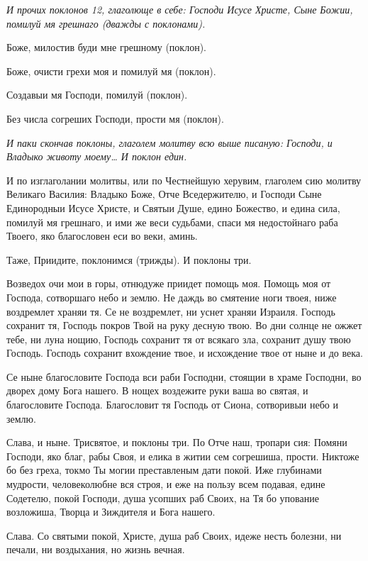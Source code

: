\itshape И прочих поклонов 12, глаголюще в себе:\normalfont{} Господи Исусе Христе, Сыне Божии, помилуй мя грешнаго (дважды с поклонами).

Боже, милостив буди мне грешному (поклон).

Боже, очисти грехи моя и помилуй мя (поклон).

Создавыи мя Господи, помилуй (поклон).

Без числа согреших Господи, прости мя (поклон).

\itshape И паки скончав поклоны, глаголем молитву всю выше писаную:\normalfont{} Господи, и Владыко животу моему… И поклон един. 


И по изглаголании молитвы, или по Честнейшую херувим, глаголем сию молитву Великаго Василия: Владыко Боже, Отче Вседержителю, и Господи Сыне Единородныи Исусе Христе, и Святыи Душе, едино Божество, и едина сила, помилуй мя грешнаго, и ими же веси судьбами, спаси мя недостойнаго раба Твоего, яко благословен еси во веки, аминь. 


Таже, Приидите, поклонимся (трижды). И поклоны три. 




Возведох очи мои в горы, отнюдуже приидет помощь моя. Помощь моя от Господа, сотворшаго небо и землю. Не даждь во смятение ноги твоея, ниже воздремлет храняи тя. Се не воздремлет, ни уснет храняи Израиля. Господь сохранит тя, Господь покров Твой на руку десную твою. Во дни солнце не ожжет тебе, ни луна нощию, Господь сохранит тя от всякаго зла, сохранит душу твою Господь. Господь сохранит вхождение твое, и исхождение твое от ныне и до века.




Се ныне благословите Господа вси раби Господни, стоящии в храме Господни, во дворех дому Бога нашего. В нощех воздежите руки ваша во святая, и благословите Господа. Благословит тя Господь от Сиона, сотворивыи небо и землю. 

Слава, и ныне. Трисвятое, и поклоны три. По Отче наш, тропари сия: Помяни Господи, яко благ, рабы Своя, и елика в житии сем согрешиша, прости. Никтоже бо без греха, токмо Ты могии преставленым дати покой. Иже глубинами мудрости, человеколюбне вся строя, и еже на пользу всем подавая, едине Содетелю, покой Господи, душа усопших раб Своих, на Тя бо упование возложиша, Творца и Зиждителя и Бога нашего. 

Слава. Со святыми покой, Христе, душа раб Своих, идеже несть болезни, ни печали, ни воздыхания, но жизнь вечная. 

